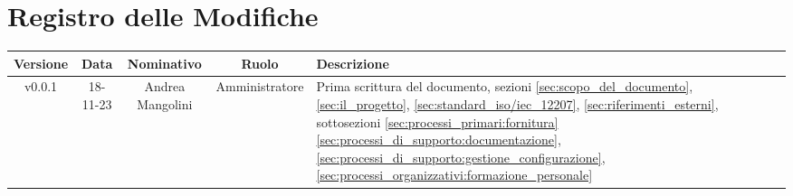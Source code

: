 \section*{\Large Registro delle Modifiche}
    \begin{table}[h]
        \centering
        \renewcommand\tabularxcolumn[1]{m{#1}} %
        \renewcommand{\arraystretch}{1.5}
        \begin{tabularx}{0.98\textwidth}
            {c|c|c|c|>{\centering\arraybackslash}X}
            \rowcolor{black}
            \textbf{\color{white} Versione} & \textbf{\color{white} Data} & \textbf{\color{white} Nominativo} & \textbf{\color{white} Ruolo} & \textbf{\color{white} Descrizione} \\ 
            \hline

            v0.0.1 & 18-11-23 & Andrea Mangolini & Amministratore & Prima scrittura del documento, sezioni \ref{sec:scopo_del_documento}, \ref{sec:il_progetto}, \ref{sec:standard_iso/iec_12207}, \ref{sec:riferimenti_esterni}, sottosezioni \ref{sec:processi_primari:fornitura} \ref{sec:processi_di_supporto:documentazione}, \ref{sec:processi_di_supporto:gestione_configurazione}, \ref{sec:processi_organizzativi:formazione_personale} \\
            \hline
        \end{tabularx}
    \end{table}